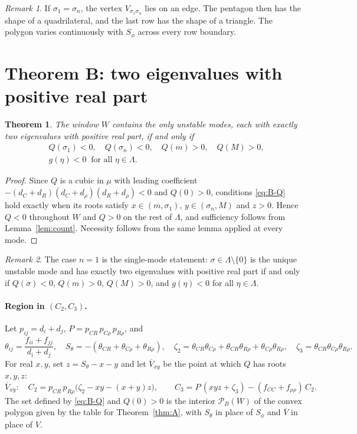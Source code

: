 \documentclass[11pt]{article}
\newtheorem{theorem}{Theorem}
\theoremstyle{definition}
\theoremstyle{remark}
\newtheorem{remark}{Remark}
\begin{document}
\begin{remark}
If $\sigma_1=\sigma_n$, the vertex $V_{\sigma_1\sigma_n}$ lies on an edge. The pentagon then has the shape of a quadrilateral, and the last row has the shape of a triangle. The polygon varies continuously with $S_\phi$ across every row boundary.
\end{remark}

\section{Theorem B: two eigenvalues with positive real part}

\begin{theorem}\label{thm:B}
The window $W$ contains the only unstable modes, each with exactly two eigenvalues with positive real part, if and only if
\begin{align}
&Q(\sigma_1)<0,\quad Q(\sigma_n)<0,\quad Q(m)>0,\quad Q(M)>0, \label{eq:B-Q}\\
&g(\eta)<0\ \text{ for all }\eta\in\Lambda. \label{eq:B-g}
\end{align}
\end{theorem}

\begin{proof}
Since $Q$ is a cubic in $\mu$ with leading coefficient $-(d_C+d_R)(d_C+d_\rho)(d_R+d_\rho)<0$ and $Q(0)>0$, conditions \eqref{eq:B-Q} hold exactly when its roots satisfy $x\in(m,\sigma_1)$, $y\in(\sigma_n,M)$ and $z>0$. Hence $Q<0$ throughout $W$ and $Q>0$ on the rest of $\Lambda$, and sufficiency follows from Lemma~\ref{lem:count}. Necessity follows from the same lemma applied at every mode.
\end{proof}

\begin{remark}
The case $n=1$ is the single-mode statement: $\sigma\in\Lambda\setminus\{0\}$ is the unique unstable mode and has exactly two eigenvalues with positive real part if and only if $Q(\sigma)<0$, $Q(m)>0$, $Q(M)>0$, and $g(\eta)<0$ for all $\eta\in\Lambda$.
\end{remark}

\paragraph{Region in $(C_2,C_3)$.} Let $p_{ij}=d_i+d_j$, $P=p_{CR}\,p_{C\rho}\,p_{R\rho}$, and
\[
\theta_{ij}=\frac{f_{ii}+f_{jj}}{d_i+d_j},\quad
S_\theta=-(\theta_{CR}+\theta_{C\rho}+\theta_{R\rho}),\quad
\zeta_2=\theta_{CR}\theta_{C\rho}+\theta_{CR}\theta_{R\rho}+\theta_{C\rho}\theta_{R\rho},\quad
\zeta_3=\theta_{CR}\theta_{C\rho}\theta_{R\rho}.
\]
For real $x,y$, set $z=S_\theta-x-y$ and let $\overline{V}_{xy}$ be the point at which $Q$ has roots $x,y,z$:
\[
\overline{V}_{xy}:\quad
C_2=p_{CR}\,p_{R\rho}\bigl(\zeta_2-xy-(x+y)z\bigr),\qquad
C_3=P\,(xyz+\zeta_3)-(f_{CC}+f_{\rho\rho})\,C_2.
\]
The set defined by \eqref{eq:B-Q} and $Q(0)>0$ is the interior $\mathcal{P}_B(W)$ of the convex polygon given by the table for Theorem~\ref{thm:A}, with $S_\theta$ in place of $S_\phi$ and $\overline{V}$ in place of $V$.
\end{document}

